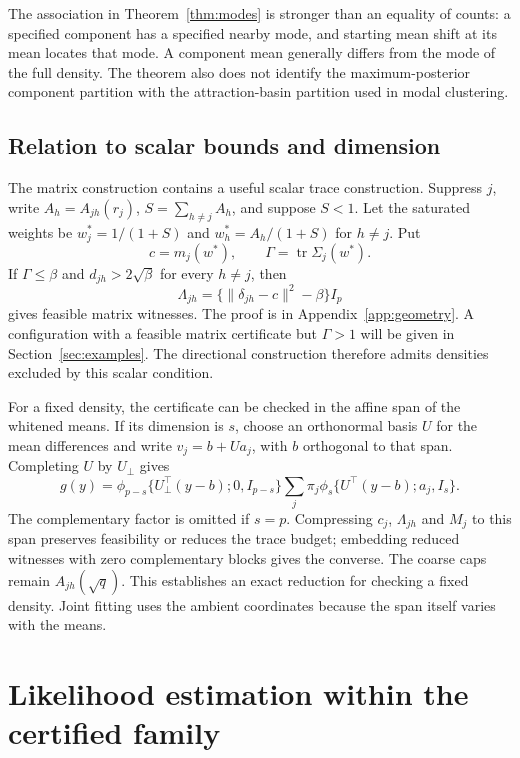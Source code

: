 \documentclass[12pt,a4paper]{article}
\theoremstyle{remark}
\DeclareMathOperator{\tr}{tr}
\begin{document}
The association in Theorem~\ref{thm:modes} is stronger than an equality of counts: a specified component has a specified nearby mode, and starting mean shift at its mean locates that mode. A component mean generally differs from the mode of the full density. The theorem also does not identify the maximum-posterior component partition with the attraction-basin partition used in modal clustering.

\subsection{Relation to scalar bounds and dimension}

The matrix construction contains a useful scalar trace construction. Suppress $j$, write $A_h=A_{jh}(r_j)$, $S=\sum_{h\ne j}A_h$, and suppose $S<1$. Let the saturated weights be $w_j^*=1/(1+S)$ and $w_h^*=A_h/(1+S)$ for $h\ne j$. Put
\[
 c=m_j(w^*),\qquad
 \Gamma=\tr\Sigma_j(w^*).
\]
If $\Gamma\le\beta$ and $d_{jh}>2\sqrt\beta$ for every $h\ne j$, then
\begin{equation}\label{eq:scalarwitness}
 \Lambda_{jh}=\{\|\delta_{jh}-c\|^2-\beta\}I_p
\end{equation}
gives feasible matrix witnesses. The proof is in Appendix~\ref{app:geometry}. A configuration with a feasible matrix certificate but $\Gamma>1$ will be given in Section~\ref{sec:examples}. The directional construction therefore admits densities excluded by this scalar condition.

For a fixed density, the certificate can be checked in the affine span of the whitened means. If its dimension is $s$, choose an orthonormal basis $U$ for the mean differences and write $v_j=b+Ua_j$, with $b$ orthogonal to that span. Completing $U$ by $U_\perp$ gives
\begin{equation}\label{eq:factorisation}
 g(y)=
 \phi_{p-s}\{U_\perp^\top(y-b);0,I_{p-s}\}
 \sum_j\pi_j\phi_s\{U^\top(y-b);a_j,I_s\}.
\end{equation}
The complementary factor is omitted if $s=p$. Compressing $c_j$, $\Lambda_{jh}$ and $M_j$ to this span preserves feasibility or reduces the trace budget; embedding reduced witnesses with zero complementary blocks gives the converse. The coarse caps remain $A_{jh}(\sqrt q)$. This establishes an exact reduction for checking a fixed density. Joint fitting uses the ambient coordinates because the span itself varies with the means.

\section{Likelihood estimation within the certified family}\label{sec:fitting}
\end{document}
